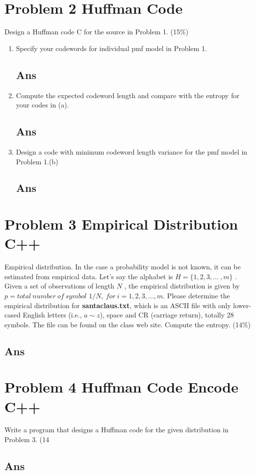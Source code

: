 \documentclass[a4paper, 11pt]{article}
\begin{document}
\section*{Problem 2 Huffman Code}
Design a Huffman code C for the source in Problem 1. (15\%)
\begin{enumerate}[label=(\alph*)]
  \item Specify your codewords for individual pmf model in Problem 1.
  \subsection*{Ans}
  \item Compute the expected codeword length and compare with the entropy for your codes in (a).
  \subsection*{Ans}
  \item Design a code with minimum codeword length variance for the pmf model in Problem 1.(b)
  \subsection*{Ans}
\end{enumerate}
\section*{Problem 3 Empirical Distribution C++}
Empirical distribution. In the case a probability model is not known, it can be 
estimated from empirical data. Let’s say the alphabet is $H=\{1, 2, 3,...~,m\}$ . 
Given a set of 
observations of length $N$ , the empirical distribution is given by $p=total~number 
~of~symbol$ $1/N,~for~i=1, 2, 3,..., m$. Please determine the empirical distribution 
for \textbf{santaclaus.txt}, which is an ASCII file with only lower-cased English 
letters (i.e., $a\sim z$), space and CR (carriage return), totally 28 symbols. The 
file can be found on the class web site. Compute the entropy. (14\%)
\subsection*{Ans}
\section*{Problem 4 Huffman Code Encode C++}
Write a program that designs a Huffman code for the given distribution in Problem 3. (14%
\subsection*{Ans}
\end{document}
